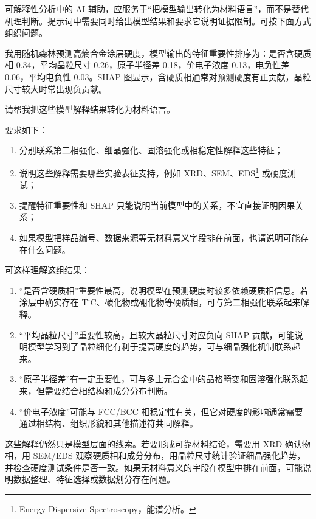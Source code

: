可解释性分析中的 AI 辅助，应服务于“把模型输出转化为材料语言”，而不是替代机理判断。提示词中需要同时给出模型结果和要求它说明证据限制。可按下面方式组织问题。

\begin{samepage}
\begin{userbox}
我用随机森林预测高熵合金涂层硬度，模型输出的特征重要性排序为：是否含硬质相 0.34，平均晶粒尺寸 0.26，原子半径差 0.18，价电子浓度 0.13，电负性差 0.06，平均电负性 0.03。SHAP 图显示，含硬质相通常对预测硬度有正贡献，晶粒尺寸较大时常出现负贡献。

请帮我把这些模型解释结果转化为材料语言。

要求如下：
\begin{enumerate}
\item 分别联系第二相强化、细晶强化、固溶强化或相稳定性解释这些特征；
\item 说明这些解释需要哪些实验表征支持，例如 XRD、SEM、EDS\footnote{Energy Dispersive Spectroscopy，能谱分析。} 或硬度测试；
\item 提醒特征重要性和 SHAP 只能说明当前模型中的关系，不宜直接证明因果关系；
\item 如果模型把样品编号、数据来源等无材料意义字段排在前面，也请说明可能存在什么问题。
\end{enumerate}
\end{userbox}

\begin{aibox}
可这样理解这组结果：

\begin{enumerate}
\item “是否含硬质相”重要性最高，说明模型在预测硬度时较多依赖硬质相信息。若涂层中确实存在 TiC、碳化物或硼化物等硬质相，可与第二相强化联系起来解释。
\item “平均晶粒尺寸”重要性较高，且较大晶粒尺寸对应负向 SHAP 贡献，可能说明模型学习到了晶粒细化有利于提高硬度的趋势，可与细晶强化机制联系起来。
\item “原子半径差”有一定重要性，可与多主元合金中的晶格畸变和固溶强化联系起来，但需要结合相结构和成分分布判断。
\item “价电子浓度”可能与 FCC/BCC 相稳定性有关，但它对硬度的影响通常需要通过相结构、组织形貌和其他描述符共同解释。
\end{enumerate}

这些解释仍然只是模型层面的线索。若要形成可靠材料结论，需要用 XRD 确认物相，用 SEM/EDS 观察硬质相和成分分布，用晶粒尺寸统计验证细晶强化趋势，并检查硬度测试条件是否一致。如果无材料意义的字段在模型中排在前面，可能说明数据整理、特征选择或数据划分存在问题。
\end{aibox}
\end{samepage}

